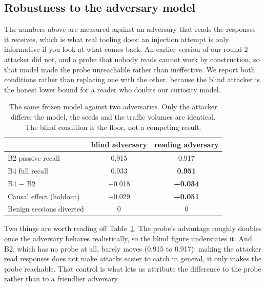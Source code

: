\subsection{Robustness to the adversary model}

The numbers above are measured against an adversary that reads the responses it
receives, which is what real tooling does: an injection attempt is only informative
if you look at what comes back. An earlier version of our round-2 attacker did not,
and a probe that nobody reads cannot work by construction, so that model made the
probe unreachable rather than ineffective. We report both conditions rather than
replacing one with the other, because the blind attacker is the honest lower bound
for a reader who doubts our curiosity model.

\begin{table}[t]
\centering
\small
\caption{The same frozen model against two adversaries. Only the attacker differs;
the model, the seeds and the traffic volumes are identical. The blind condition is
the floor, not a competing result.}
\label{tab:adversary}
\begin{tabular}{lcc}
\toprule
 & blind adversary & reading adversary \\
\midrule
B2 passive recall & 0.915 & 0.917 \\
B4 full recall & 0.933 & \textbf{0.951} \\
B4 $-$ B2 & +0.018 & \textbf{+0.034} \\
Causal effect (holdout) & +0.029 & \textbf{+0.051} \\
Benign sessions diverted & 0 & 0 \\
\bottomrule
\end{tabular}
\end{table}

Two things are worth reading off Table~\ref{tab:adversary}. The probe's advantage
roughly doubles once the adversary behaves realistically, so the blind figure
understates it. And B2, which has no probe at all, barely moves (0.915 to 0.917):
making the attacker read responses does not make attacks easier to catch in
general, it only makes the probe reachable. That control is what lets us attribute
the difference to the probe rather than to a friendlier adversary.

